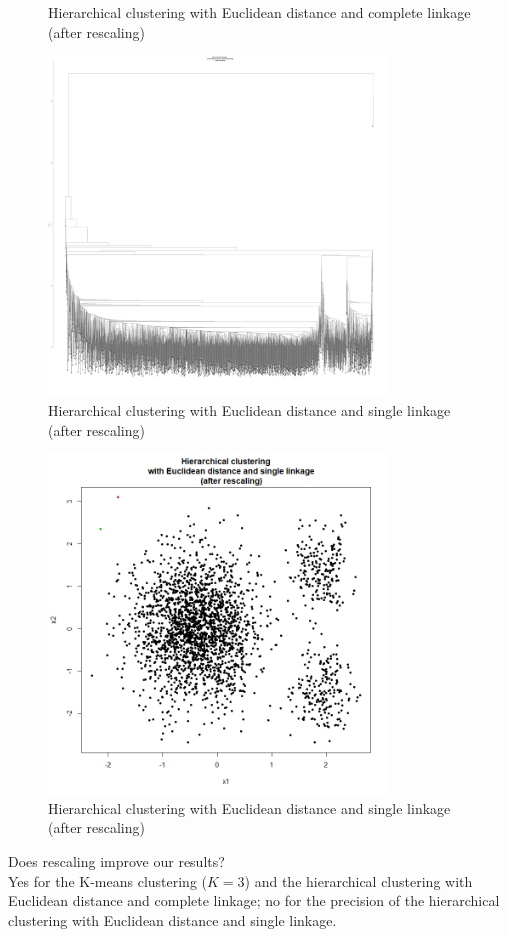 \documentclass[10pt]{article}
\begin{document}
\begin{enumerate}[1)]
\begin{figure}[H]
  \caption{Hierarchical clustering with Euclidean distance and complete linkage (after rescaling)}
\end{figure}

\begin{figure}[H]
  \centering
  \includegraphics[width=9cm,height=9cm]{p34d.jpeg}
  \caption{Hierarchical clustering with Euclidean distance and single linkage (after rescaling)}
\end{figure}
\begin{figure}[H]
  \centering
  \includegraphics[width=9cm,height=9cm]{p34e.jpeg}
  \caption{Hierarchical clustering with Euclidean distance and single linkage (after rescaling)}
\end{figure}

Does rescaling improve our results?\\
Yes for the K-means clustering ($K=3$) and the hierarchical clustering with Euclidean distance and complete linkage; no for the precision of the hierarchical clustering with Euclidean distance and single linkage.
\vspace{3mm}


\end{enumerate}
\end{document}
